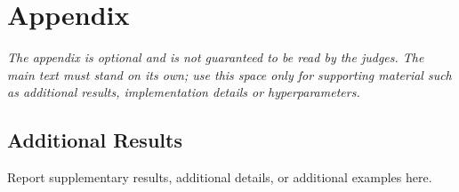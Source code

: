 \documentclass[10pt]{nvidiaextabstract}
\begin{document}

\clearpage
\appendix

\section{Appendix}
\label{sec:appendix}

\textit{The appendix is optional and is not guaranteed to be read by the
judges. The main text must stand on its own; use this space only for
supporting material such as additional results, implementation details
or hyperparameters.}

\subsection{Additional Results}
\label{sec:appendix-results}

Report supplementary results, additional details, or additional examples here.
\end{document}
